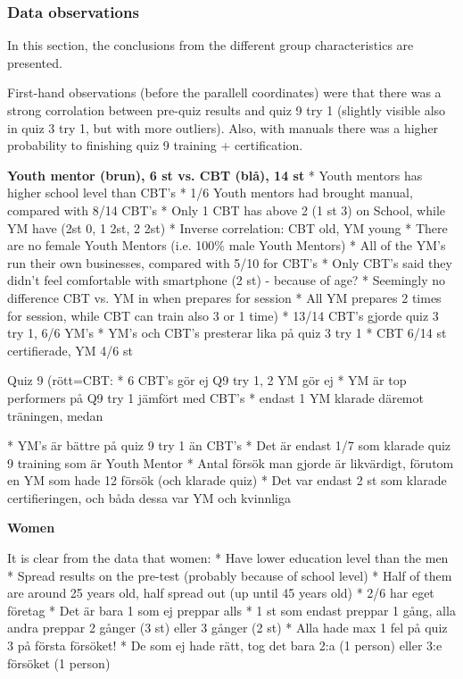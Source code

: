 \subsubsection{Data observations}



In this section, the conclusions from the different group characteristics are presented.

First-hand observations (before the parallell coordinates) were that there was a strong corrolation between pre-quiz results and quiz 9 try 1 (slightly visible also in quiz 3 try 1, but with more outliers). Also, with manuals there was a higher probability to finishing quiz 9 training + certification.

\textbf{Youth mentor (brun), 6 st vs. CBT (blå), 14 st}
* Youth mentors has higher school level than CBT's
* 1/6 Youth mentors had brought manual, compared with 8/14 CBT's
* Only 1 CBT has above 2 (1 st 3) on School, while YM have (2st 0, 1 2st, 2 2st)
* Inverse correlation: CBT old, YM young
* There are no female Youth Mentors (i.e. 100\% male Youth Mentors)
* All of the YM's run their own businesses, compared with 5/10 for CBT's
* Only CBT's said they didn't feel comfortable with smartphone (2 st) - because of age?
* Seemingly no difference CBT vs. YM in when prepares for session
* All YM prepares 2 times for session, while CBT can train also 3 or 1 time)
* 13/14 CBT's gjorde quiz 3 try 1, 6/6 YM's
* YM's och CBT's presterar lika på quiz 3 try 1
* CBT 6/14 st certifierade, YM 4/6 st

Quiz 9 (rött=CBT:
* 6 CBT's gör ej Q9 try 1, 2 YM gör ej
* YM är top performers på Q9 try 1 jämfört med CBT's
* endast 1 YM klarade däremot träningen, medan

* YM's är bättre på quiz 9 try 1 än CBT's
* Det är endast 1/7 som klarade quiz 9 training som är Youth Mentor
* Antal försök man gjorde är likvärdigt, förutom en YM som hade 12 försök (och klarade quiz)
* Det var endast 2 st som klarade certifieringen, och båda dessa var YM och kvinnliga

\textbf{Women}

It is clear from the data that women:
* Have lower education level than the men
* Spread results on the pre-test (probably because of school level)
* Half of them are around 25 years old, half spread out (up until 45 years old)
* 2/6 har eget företag
* Det är bara 1 som ej preppar alls
* 1 st som endast preppar 1 gång, alla andra preppar 2 gånger (3 st) eller 3 gånger (2 st)
* Alla hade max 1 fel på quiz 3 på första försöket!
* De som ej hade rätt, tog det bara 2:a (1 person) eller 3:e försöket (1 person)

